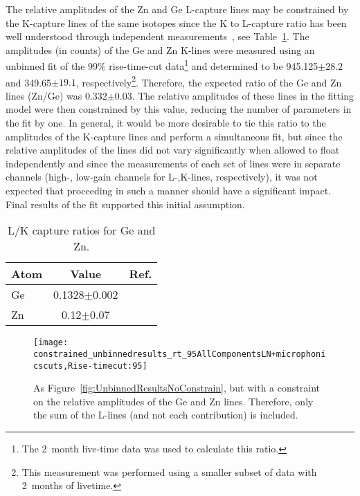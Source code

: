 The relative amplitudes of the Zn and Ge L-capture lines may be constrained by the K-capture lines of the same isotopes since the K to L-capture ratio has been well understood through independent measurements~\cite{Bea67,Ocampo1962}, see Table~\ref{tab:LKRatios}.  The amplitudes (in counts) of the Ge and Zn K-lines were measured using an unbinned fit of the 99\% rise-time-cut data\footnote{The 2~month live-time data was used to calculate this ratio.} and determined to be 945.125$\pm28.2$ and 349.65$\pm19.1$, respectively\footnote{This measurement was performed using a smaller subset of data with 2~months of livetime.}.  Therefore, the expected ratio of the Ge and Zn lines (Zn/Ge) was 0.332$\pm$0.03.  The relative amplitudes of these lines in the fitting model were then constrained by this value, reducing the number of parameters in the fit by one.  In general, it would be more desirable to tie this ratio to the amplitudes of the K-capture lines and perform a simultaneous fit, but since the relative amplitudes of the lines did not vary significantly when allowed to float independently and since the measurements of each set of lines were in separate channels (high-, low-gain channels for L-,K-lines, respectively), it was not expected that proceeding in such a manner should have a significant impact.  Final results of the fit supported this initial assumption.
	
			\begin{table}
				\centering
				\begin{tabular}{lcr}
					\toprule
					Atom & Value & Ref.\\
					\midrule
					Ge & 0.1328$\pm$0.002 & \cite{Bea67}\\
					Zn & 0.12$\pm$0.07 & \cite{Ocampo1962}\\
					\bottomrule
				\end{tabular}	
				\caption[L/K capture ratios for Ge and Zn]
				{L/K capture ratios for Ge and Zn.}
				\label{tab:LKRatios}
			\end{table}
			
			\begin{figure}
				\centering				
				\texttt{[image: constrained\_unbinnedresults\_rt\_95AllComponentsLN+microphonicscuts,Rise-timecut:95]}				
				\caption[Results from an unbinned fit, constraints on relative amplitude of Ge and Zn lines]
				{As Figure~\ref{fig:UnbinnedResultsNoConstrain}, but with a constraint on the relative amplitudes 
				of the Ge and Zn lines.  Therefore, only the sum of the L-lines (and not each contribution) is included.  }
				\label{fig:UnBinnedResultsConstrain}
			\end{figure}
					
